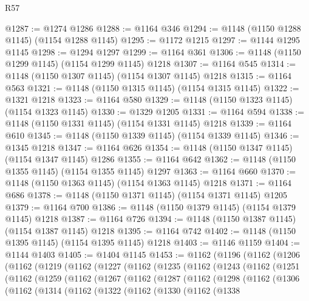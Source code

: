 \begin{lexlean}{R57}
\begin{coremodule}
@1287 := @1274 @1286
@1288 := @1164 @346
@1294 := @1148 (@1150 @1288 @1145) (@1154 @1288 @1145)
@1295 := @1172 @1215
@1297 := @1144 @1295 @1145
@1298 := @1294 @1297
@1299 := @1164 @361
@1306 := @1148 (@1150 @1299 @1145) (@1154 @1299 @1145) @1218
@1307 := @1164 @545
@1314 := @1148 (@1150 @1307 @1145) (@1154 @1307 @1145) @1218
@1315 := @1164 @563
@1321 := @1148 (@1150 @1315 @1145) (@1154 @1315 @1145)
@1322 := @1321 @1218
@1323 := @1164 @580
@1329 := @1148 (@1150 @1323 @1145) (@1154 @1323 @1145)
@1330 := @1329 @1205
@1331 := @1164 @594
@1338 := @1148 (@1150 @1331 @1145) (@1154 @1331 @1145) @1218
@1339 := @1164 @610
@1345 := @1148 (@1150 @1339 @1145) (@1154 @1339 @1145)
@1346 := @1345 @1218
@1347 := @1164 @626
@1354 := @1148 (@1150 @1347 @1145) (@1154 @1347 @1145) @1286
@1355 := @1164 @642
@1362 := @1148 (@1150 @1355 @1145) (@1154 @1355 @1145) @1297
@1363 := @1164 @660
@1370 := @1148 (@1150 @1363 @1145) (@1154 @1363 @1145) @1218
@1371 := @1164 @686
@1378 := @1148 (@1150 @1371 @1145) (@1154 @1371 @1145) @1205
@1379 := @1164 @700
@1386 := @1148 (@1150 @1379 @1145) (@1154 @1379 @1145) @1218
@1387 := @1164 @726
@1394 := @1148 (@1150 @1387 @1145) (@1154 @1387 @1145) @1218
@1395 := @1164 @742
@1402 := @1148 (@1150 @1395 @1145) (@1154 @1395 @1145) @1218
@1403 := @1146 @1159
@1404 := @1144 @1403
@1405 := @1404 @1145
@1453 := @1162
    (@1196
      (@1162
        (@1206
          (@1162
            (@1219
              (@1162
                (@1227
                  (@1162
                    (@1235
                      (@1162
                        (@1243
                          (@1162
                            (@1251
                              (@1162
                                (@1259
                                  (@1162
                                    (@1267
                                      (@1162
                                        (@1287
                                          (@1162
                                            (@1298
                                              (@1162
                                                (@1306
                                                  (@1162
                                                    (@1314
                                                      (@1162
                                                        (@1322
                                                          (@1162
                                                            (@1330
                                                              (@1162
                                                                (@1338

\end{coremodule}
\end{lexlean}
